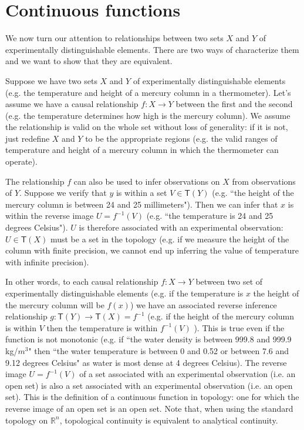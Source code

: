 \documentclass[11pt,letterpaper,fleqn]{memoir} %
\begin{document}
\section{Continuous functions}

We now turn our attention to relationships between two sets $X$ and $Y$ of experimentally distinguishable elements. There are two ways of characterize them and we want to show that they are equivalent.

Suppose we have two sets $X$ and $Y$ of experimentally distinguishable elements (e.g. the temperature and height of a mercury column in a thermometer). Let's assume we have a causal relationship $f: X \rightarrow Y$ between the first and the second (e.g. the temperature determines how high is the mercury column). We assume the relationship is valid on the whole set without loss of generality: if it is not, just redefine $X$ and $Y$ to be the appropriate regions (e.g. the valid ranges of temperature and height of a mercury column in which the thermometer can operate).

The relationship $f$ can also be used to infer observations on $X$ from observations of $Y$. Suppose we verify that $y$ is within a set $V \in \mathsf{T}(Y)$ (e.g. ``the height of the mercury column is between 24 and 25 millimeters"). Then we can infer that $x$ is within the reverse image $U=f^{-1}(V)$ (e.g. ``the temperature is 24 and 25 degrees Celsius"). $U$ is therefore associated with an experimental observation: $U \in \mathsf{T}(X)$ must be a set in the topology (e.g. if we measure the height of the column with finite precision, we cannot end up inferring the value of temperature with infinite precision).

In other words, to each causal relationship $f: X \rightarrow Y$ between two set of experimentally distinguishable elements (e.g. if the temperature is $x$ the height of the mercury column will be $f(x)$) we have an associated reverse inference relationship $g  : \mathsf{T}(Y) \rightarrow \mathsf{T}(X) = f^{-1}$ (e.g. if the height of the mercury column is within $V$ then the temperature is within $f^{-1}(V)$ ). This is true even if the function is not monotonic (e.g. if ``the water density is between 999.8 and 999.9 kg/$m^3$" then ``the water temperature is between 0 and 0.52 or between 7.6 and 9.12 degrees Celsius" as water is most dense at 4 degrees Celsius).  The reverse image $U=f^{-1}(V)$ of a set associated with an experimental observation (i.e. an open set) is also a set associated with an experimental observation (i.e. an open set). This is the definition of a continuous function in topology: one for which the reverse image of an open set is an open set. Note that, when using the standard topology on $\mathbb{R}^n$, topological continuity is equivalent to analytical continuity.
\end{document}
